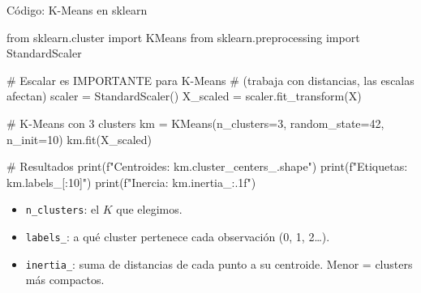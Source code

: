 \documentclass[aspectratio=169, 11pt]{beamer}
\begin{document}
\begin{frame}[fragile,shrink=18]{C\'odigo: K-Means en sklearn}
  \vspace{-6pt}
  \begin{pyblock}
from sklearn.cluster import KMeans
from sklearn.preprocessing import StandardScaler

# Escalar es IMPORTANTE para K-Means
# (trabaja con distancias, las escalas afectan)
scaler = StandardScaler()
X_scaled = scaler.fit_transform(X)

# K-Means con 3 clusters
km = KMeans(n_clusters=3, random_state=42, n_init=10)
km.fit(X_scaled)

# Resultados
print(f"Centroides: {km.cluster_centers_.shape}")
print(f"Etiquetas:  {km.labels_[:10]}")
print(f"Inercia:    {km.inertia_:.1f}")
  \end{pyblock}

  \vspace{4pt}
  {\scriptsize\color{arcaDark}
  \begin{itemize}\setlength{\itemsep}{3pt}
    \item[{\color{arcaRed}\scriptsize\faArrowRight}]
      \texttt{n\_clusters}: el $K$ que elegimos.
    \item[{\color{arcaRed}\scriptsize\faArrowRight}]
      \texttt{labels\_}: a qu\'e cluster pertenece cada observaci\'on (0, 1, 2\ldots).
    \item[{\color{arcaRed}\scriptsize\faArrowRight}]
      \texttt{inertia\_}: suma de distancias de cada punto a su centroide.
      Menor = clusters m\'as compactos.
  \end{itemize}
  }
\end{frame}
\end{document}
